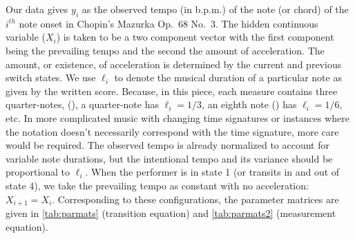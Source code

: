 \documentclass[aoas]{imsart}
\begin{document}
Our data gives $y_i$ as the observed tempo (in b.p.m.) of the note (or
chord) of the $i^{th}$ note onset in Chopin's Mazurka Op.\ 68 No.\ 3. The
hidden continuous variable ($X_i$) is 
taken to be a two component vector with the first component being the
prevailing tempo and the second the amount of acceleration. The amount, or
existence, of acceleration is determined by the current and previous
switch states. We use $\ell_i$ to denote the musical duration of
a particular note as given by the written score. Because, in this
piece, each measure contains three quarter-notes, (\quarternote), a quarter-note has $\ell_i=1/3$, an
eighth note (\eighthnote) has $\ell_i=1/6$, etc. In more complicated
music with changing time signatures or instances where the notation
doesn't necessarily correspond with the time signature, more care
would be required. The observed tempo is already normalized to account
for variable note durations, but the intentional tempo and its
variance should be proportional to $\ell_i$. When the performer is in state 1 (or
transits in and out of state 4), we take the prevailing tempo as
constant with no acceleration: $X_{i+1} = X_i$. 
Corresponding to these configurations, the parameter
matrices are given in \autoref{tab:parmats} (transition equation) and
\autoref{tab:parmats2} (measurement equation).
\end{document}
